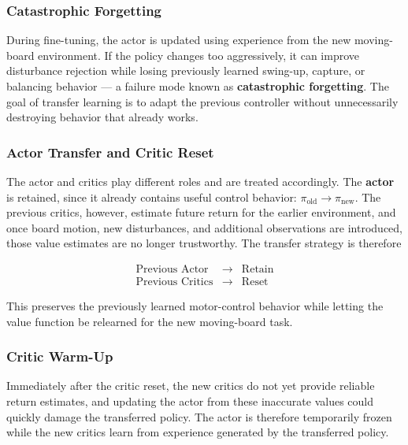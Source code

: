 \documentclass[9pt]{extarticle}
\begin{document}
\subsubsection{Catastrophic Forgetting}

During fine-tuning, the actor is updated using experience from the new
moving-board environment. If the policy changes too aggressively, it can
improve disturbance rejection while losing previously learned swing-up,
capture, or balancing behavior — a failure mode known as
\textbf{catastrophic forgetting}. The goal of transfer learning is to adapt
the previous controller without unnecessarily destroying behavior that
already works.

\subsubsection{Actor Transfer and Critic Reset}

The actor and critics play different roles and are treated accordingly.
The \textbf{actor} is retained, since it already contains useful control
behavior: $\pi_{\mathrm{old}} \rightarrow \pi_{\mathrm{new}}$. The previous
critics, however, estimate future return for the earlier environment, and
once board motion, new disturbances, and additional observations are
introduced, those value estimates are no longer trustworthy. The transfer
strategy is therefore

\begin{equation}
\boxed{
\begin{array}{ccc}
\text{Previous Actor} & \longrightarrow & \text{Retain} \\
\text{Previous Critics} & \longrightarrow & \text{Reset}
\end{array}}
\end{equation}

This preserves the previously learned motor-control behavior while letting
the value function be relearned for the new moving-board task.

\subsubsection{Critic Warm-Up}

Immediately after the critic reset, the new critics do not yet provide
reliable return estimates, and updating the actor from these inaccurate
values could quickly damage the transferred policy. The actor is therefore
temporarily frozen while the new critics learn from experience generated by
the transferred policy.
\end{document}
